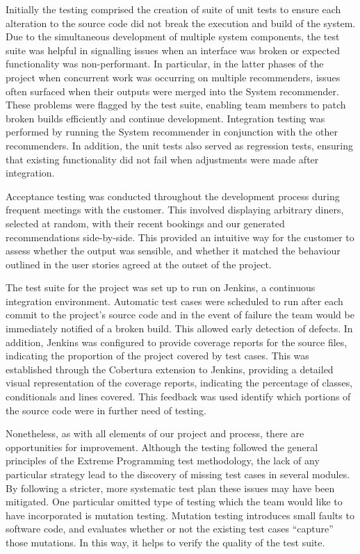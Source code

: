\documentclass{l3proj}
\begin{document}
Initially the testing comprised the creation of suite of unit tests to ensure each alteration to the source code did not break the execution and build of the system. Due to the simultaneous development of multiple system components, the test suite was helpful in signalling issues when an interface was broken or expected functionality was non-performant. In particular, in the latter phases of the project when concurrent work was occurring on multiple recommenders, issues often surfaced when their outputs were merged into the System recommender. These problems were flagged by the test suite, enabling team members to patch broken builds efficiently and continue development. Integration testing was performed by running the System recommender in conjunction with the other recommenders. In addition, the unit tests also served as regression tests, ensuring that existing functionality did not fail when adjustments were made after integration.

Acceptance testing was conducted throughout the development process during frequent meetings with the customer. This involved displaying arbitrary diners, selected at random, with their recent bookings and our generated recommendations side-by-side. This provided an intuitive way for the customer to assess whether the output was sensible, and whether it matched the behaviour outlined in the user stories agreed at the outset of the project.

The test suite for the project was set up to run on Jenkins, a continuous integration environment. Automatic test cases were scheduled to run after each commit to the project's source code and in the event of failure the team would be immediately notified of a broken build. This allowed early detection of defects. In addition, Jenkins was configured to provide coverage reports for the source files, indicating the proportion of the project covered by test cases. This was established through the Cobertura extension to Jenkins,  providing a detailed visual representation of the coverage reports, indicating the percentage of classes, conditionals and lines covered. This feedback was used identify which portions of the source code were in further need of testing.

Nonetheless, as with all elements of our project and process, there are opportunities for improvement. Although the testing followed the general principles of the Extreme Programming test methodology, the lack of any particular strategy lead to the discovery of missing test cases in several modules. By following a stricter, more systematic test plan these issues may have been mitigated. One particular omitted type of testing which the team would like to have incorporated is mutation testing. Mutation testing introduces small faults to software code, and evaluates whether or not the existing test cases “capture” those mutations. In this way, it helps to verify the quality of the test suite.
\end{document}
